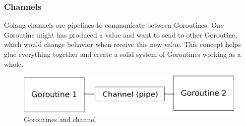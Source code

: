 \subsubsection* {Channels}
Golang channels are pipelines to communicate between Goroutines. One Goroutine might has produced a value and want to send to other Goroutine, which would change behavior when receive this new value. This concept helps glue everything together and create a solid system of Goroutines working as a whole.

\begin{figure}
  \includegraphics[width=1\textwidth]{goroutine.eps}
  \caption{Goroutines and channel}

\end{figure}
